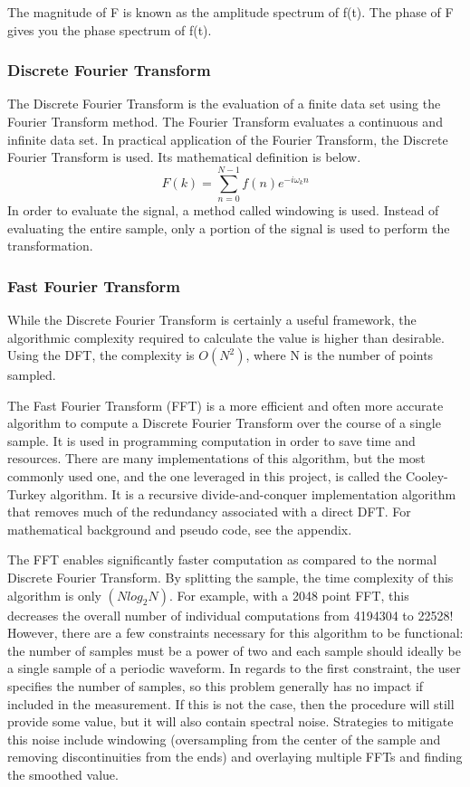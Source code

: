 \documentclass{article}
\begin{document}
The magnitude of F is known as the amplitude spectrum of f(t). The phase of F gives you the phase spectrum of f(t).
\subsubsection{Discrete Fourier Transform}
The Discrete Fourier Transform is the evaluation of a finite data set using the Fourier Transform method. The Fourier Transform evaluates a continuous and infinite data set. In practical application of the Fourier Transform, the Discrete Fourier Transform is used. Its mathematical definition is below. 
\begin{equation}
    F(k) = \sum_{n=0}^{N-1}f(n)e^{-i\omega_kn}
\end{equation}
In order to evaluate the signal, a method called windowing is used. Instead of evaluating the entire sample, only a portion of the signal is used to perform the transformation.
\subsubsection{Fast Fourier Transform}
While the Discrete Fourier Transform is certainly a useful framework, the algorithmic complexity required to calculate the value is higher than desirable. Using the DFT, the complexity is $O(N^{2})$, where N is the number of points sampled.

The Fast Fourier Transform (FFT) is a more efficient and often more accurate algorithm to compute a Discrete Fourier Transform over the course of a single sample. It is used in programming computation in order to save time and resources. There are many implementations of this algorithm, but the most commonly used one, and the one leveraged in this project, is called the Cooley-Turkey algorithm. It is a recursive divide-and-conquer implementation algorithm that removes much of the redundancy associated with a direct DFT. For mathematical background and pseudo code, see the appendix.

The FFT enables significantly faster computation as compared to the normal Discrete Fourier Transform. By splitting the sample, the time complexity of this algorithm is only $(Nlog_2N)$. For example, with a 2048 point FFT, this decreases the overall number of individual computations from 4194304 to 22528! However, there are a few constraints necessary for this algorithm to be functional: the number of samples must be a power of two and each sample should ideally be a single sample of a periodic waveform. In regards to the first constraint,  the user specifies the number of samples, so this problem generally has no impact if included in the measurement. If this is not the case, then the procedure will still provide some value, but it will also contain spectral noise. Strategies to mitigate this noise include windowing (oversampling from the center of the sample and removing discontinuities from the ends) and overlaying multiple FFTs and finding the smoothed value.
\end{document}
